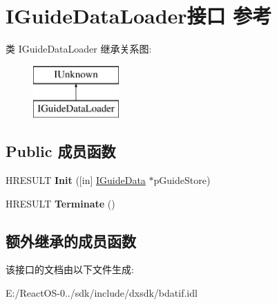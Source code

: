 \hypertarget{interface_i_guide_data_loader}{}\section{I\+Guide\+Data\+Loader接口 参考}
\label{interface_i_guide_data_loader}
类 I\+Guide\+Data\+Loader 继承关系图\+:\begin{figure}[H]
\begin{center}
\leavevmode
\includegraphics[height=2.000000cm]{interface_i_guide_data_loader}
\end{center}
\end{figure}
\subsection*{Public 成员函数}
\begin{DoxyCompactItemize}
\item 
\mbox{\label{interface_i_guide_data_loader_aeb28db277d53e959c46ef7a5e8230e0e}} 
H\+R\+E\+S\+U\+LT {\bfseries Init} (\mbox{[}in\mbox{]} \hyperlink{interface_i_guide_data}{I\+Guide\+Data} $\ast$p\+Guide\+Store)
\item 
\mbox{\label{interface_i_guide_data_loader_a4fd93e46de25a168656c10d2102477fb}} 
H\+R\+E\+S\+U\+LT {\bfseries Terminate} ()
\end{DoxyCompactItemize}
\subsection*{额外继承的成员函数}


该接口的文档由以下文件生成\+:\begin{DoxyCompactItemize}
\item 
E\+:/\+React\+O\+S-\/0../sdk/include/dxsdk/bdatif.\+idl\end{DoxyCompactItemize}
